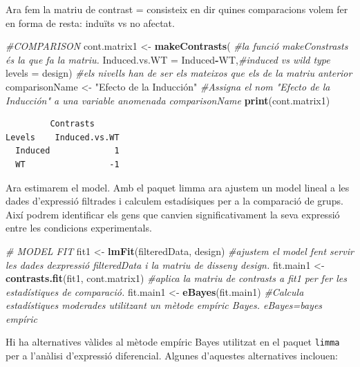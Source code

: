 \documentclass[
]{article}
\newenvironment{Shaded}{\begin{snugshade}}{\end{snugshade}}
\newcommand{\AttributeTok}[1]{\textcolor[rgb]{0.13,0.29,0.53}{#1}}
\newcommand{\CommentTok}[1]{\textcolor[rgb]{0.56,0.35,0.01}{\textit{#1}}}
\newcommand{\FunctionTok}[1]{\textcolor[rgb]{0.13,0.29,0.53}{\textbf{#1}}}
\newcommand{\NormalTok}[1]{#1}
\newcommand{\OtherTok}[1]{\textcolor[rgb]{0.56,0.35,0.01}{#1}}
\newcommand{\SpecialCharTok}[1]{\textcolor[rgb]{0.81,0.36,0.00}{\textbf{#1}}}
\newcommand{\StringTok}[1]{\textcolor[rgb]{0.31,0.60,0.02}{#1}}
\begin{document}
Ara fem la matriu de contrast = consisteix en dir quines comparacions
volem fer en forma de resta: induïts vs no afectat.

\begin{Shaded}
\begin{Highlighting}[]
\CommentTok{\#COMPARISON}
\NormalTok{cont.matrix1 }\OtherTok{\textless{}{-}} \FunctionTok{makeContrasts}\NormalTok{(  }\CommentTok{\#la funció makeConstrasts és la que fa la matriu.}
        \AttributeTok{Induced.vs.WT =}\NormalTok{ Induced}\SpecialCharTok{{-}}\NormalTok{WT,}\CommentTok{\#induced vs wild type}
        \AttributeTok{levels =}\NormalTok{ design) }\CommentTok{\#els nivells han de ser els mateixos que els de la matriu anterior}
\NormalTok{comparisonName }\OtherTok{\textless{}{-}} \StringTok{"Efecto de la Inducción"} \CommentTok{\#Assigna el nom "Efecto de la Inducción" a una variable anomenada comparisonName}
\FunctionTok{print}\NormalTok{(cont.matrix1)}
\end{Highlighting}
\end{Shaded}

\begin{verbatim}
         Contrasts
Levels    Induced.vs.WT
  Induced             1
  WT                 -1
\end{verbatim}

Ara estimarem el model. Amb el paquet limma ara ajustem un model lineal
a les dades d'expressió filtrades i calculem estadísiques per a la
comparació de grups. Així podrem identificar els gens que canvien
significativament la seva expressió entre les condicions experimentals.

\begin{Shaded}
\begin{Highlighting}[]
\CommentTok{\# MODEL FIT}
\NormalTok{fit1 }\OtherTok{\textless{}{-}} \FunctionTok{lmFit}\NormalTok{(filteredData, design)  }\CommentTok{\#ajustem el model fent servir les dades d\textquotesingle{}expressió filteredData i la matriu de disseny design.}
\NormalTok{fit.main1 }\OtherTok{\textless{}{-}} \FunctionTok{contrasts.fit}\NormalTok{(fit1, cont.matrix1)  }\CommentTok{\#aplica la matriu de contrasts a fit1 per fer les estadístiques de comparació.}
\NormalTok{fit.main1 }\OtherTok{\textless{}{-}} \FunctionTok{eBayes}\NormalTok{(fit.main1)  }\CommentTok{\#Calcula estadístiques moderades utilitzant un mètode empíric Bayes. eBayes=bayes empíric}
\end{Highlighting}
\end{Shaded}

Hi ha alternatives vàlides al mètode empíric Bayes utilitzat en el
paquet \texttt{limma} per a l'anàlisi d'expressió diferencial. Algunes
d'aquestes alternatives inclouen:
\end{document}
